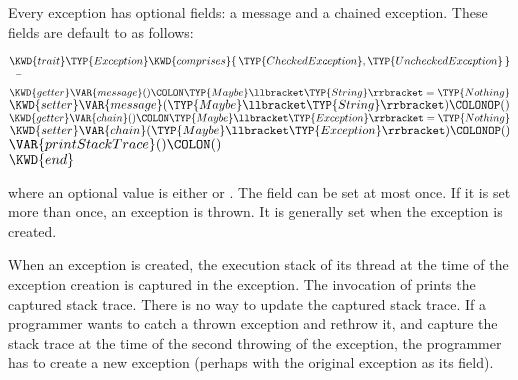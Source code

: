 Every exception has optional fields: a message and a chained exception.
These fields are default to  as follows:
\begin{Fortress}
\(\KWD{trait} \TYP{Exception} \KWD{comprises} \{\,\TYP{CheckedException}, \TYP{UncheckedException}\,\}\)\\
{\tt~~}\pushtabs\=\+\(  \KWD{getter} \VAR{message}()\COLON \TYP{Maybe}\llbracket\TYP{String}\rrbracket = \TYP{Nothing}\)\\
\(  \KWD{setter} \VAR{message}(\TYP{Maybe}\llbracket\TYP{String}\rrbracket)\COLONOP()\)\\
\(  \KWD{getter} \VAR{chain}()\COLON \TYP{Maybe}\llbracket\TYP{Exception}\rrbracket = \TYP{Nothing}\)\\
\(  \KWD{setter} \VAR{chain}(\TYP{Maybe}\llbracket\TYP{Exception}\rrbracket)\COLONOP()\)\\
\(  \VAR{printStackTrace}()\COLON ()\)\-\\\poptabs
\(\KWD{end}\)
\end{Fortress}
where an optional value  is either  or
.
The  field can be set at most once.  If it is set more than
once, an  exception is thrown.
It is generally set when the exception is created.


When an exception is created, the execution stack of its thread at the time
of the exception creation is captured in the exception.  The invocation of
 prints the captured stack trace.
There is no way to update the captured stack trace.
If a programmer wants to catch a thrown exception and rethrow it, and
capture the stack trace at the time of the second throwing of the
exception, the programmer has to create a new exception (perhaps with the
original exception as its  field).

